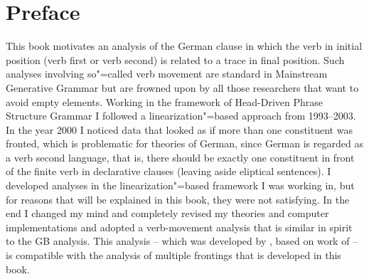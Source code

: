 









\frontmatter

\maketitle

\tableofcontents


\chapter*{Preface}

This book motivates an analysis of the German clause in which the verb in initial position (verb
first or verb second) is related to a trace in final position. Such analyses involving so"=called
verb movement are standard in Mainstream Generative Grammar but are frowned upon by all those
researchers that want to avoid empty elements. Working in the framework of Head-Driven Phrase
Structure Grammar I followed a linearization"=based approach \citep{Reape90a,Reape94a} from
1993--2003. In the year 2000 I noticed data that looked as if more than one constituent was fronted,
which is problematic for theories of German, since German is regarded as a verb second language,
that is, there should be exactly one constituent in front of the finite verb in declarative clauses
(leaving aside eliptical sentences). I developed analyses in the linearization"=based framework I
was working in, but for reasons that will be explained in this book, they were not satisfying. In
the end I changed my mind and completely revised my theories and computer implementations and
adopted a verb-movement analysis that is similar in spirit to the GB analysis. This analysis --
which was developed by \citet{Meurers99a}, based on work of \citet{KW91a,Kiss95a} -- is compatible
with the analysis of multiple frontings that is developed in this book. 

